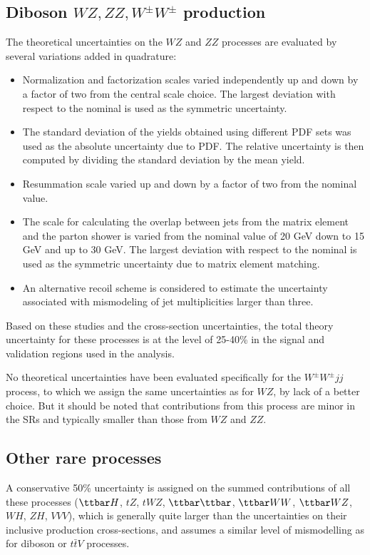 \subsection*{Diboson $WZ, ZZ, W^\pm W^\pm$ production}

The theoretical uncertainties on the  $WZ$ and $ZZ$ processes are evaluated by several variations added in quadrature:
\begin{itemize}
\item Normalization and factorization scales varied independently up and down by a factor of two from the central scale choice. The largest deviation with respect to the nominal is used as the 
symmetric uncertainty.
\item The standard deviation of the yields obtained using different PDF sets was used as the absolute uncertainty due to PDF. 
The relative uncertainty is then computed by dividing the standard deviation by the mean yield.
\item Resummation scale varied up and down by a factor of two from the nominal value.
\item The scale for calculating the overlap between jets from the matrix element and the parton shower is varied from the nominal value of 20 GeV down to 15 GeV 
 and up to 30 GeV. The largest deviation with respect to the nominal is used as the symmetric uncertainty due to matrix element matching.
\item An alternative recoil scheme is considered to estimate the uncertainty associated with mismodeling of jet multiplicities larger than three.
\end{itemize}

Based on these studies and the cross-section uncertainties, the total theory uncertainty for these processes is at the level of 25-40\% in the signal and validation regions used in the analysis. 

No theoretical uncertainties have been evaluated specifically for the $W^\pm W^\pm jj$ process, 
to which we assign the same uncertainties as for $WZ$, by lack of a better choice. 
But it should be noted that contributions from this process are minor in the SRs and typically  
smaller than those from $WZ$ and $ZZ$.

\subsection*{Other rare processes}
A conservative 50\% uncertainty is assigned on the summed contributions 
of all these processes ($\ttbar H$, $tZ$, $tWZ$, $\ttbar\ttbar$, $\ttbar WW$, $\ttbar WZ$, $WH$, $ZH$, $VVV$), 
which is generally quite larger than the uncertainties on their inclusive production cross-sections, 
and assumes a similar level of mismodelling as for diboson or $t\bar t V$ processes. 
